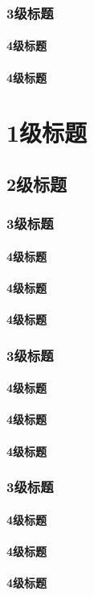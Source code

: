 \subsection{3级标题}
\subsubsection{4级标题}
\subsubsection{4级标题}

\chapter{1级标题}
\section{2级标题}
\subsection{3级标题}
\subsubsection{4级标题}
\subsubsection{4级标题}
\subsubsection{4级标题}
\subsection{3级标题}
\subsubsection{4级标题}
\subsubsection{4级标题}
\subsubsection{4级标题}
\subsection{3级标题}
\subsubsection{4级标题}
\subsubsection{4级标题}
\subsubsection{4级标题}

